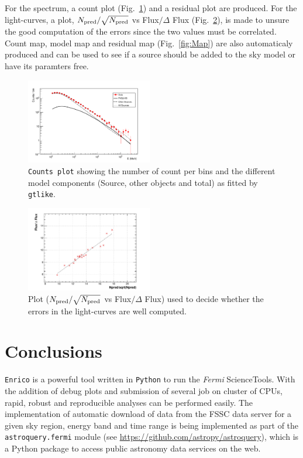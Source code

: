 \documentclass[a4paper]{article}
\newcommand{\Fermi}{\textit{Fermi} }
\begin{document}
For the spectrum, a count plot (Fig.~\ref{fig:control1}) and a residual plot are produced. For the light-curves, a plot, $N_{\rm pred}/\sqrt{N_{\rm pred}}$ vs Flux$/\Delta$ Flux (Fig.~\ref{fig:control2}), is made to unsure the good computation of the errors since the two values must be correlated. Count map, model map and residual map (Fig.~\ref{fig:Map}) are also automaticaly produced and can be used to see if a source should be added to the sky model or have its paramters free.


 \begin{figure}[t]
  \includegraphics[width=0.49\textwidth]{icrc2013_89_04}
  \caption{{\tt Counts plot} showing the number of count per bins and the different model components (Source, other objects and total) as fitted by {\tt gtlike}.}
\label{fig:control1}
 \end{figure}

 \begin{figure}[t]
  \includegraphics[width=0.49\textwidth]{icrc2013_89_05}
  \caption{Plot ($N_{\rm pred}/\sqrt{N_{\rm pred}}$ vs Flux$/\Delta$ Flux) used to decide whether the errors in the light-curves are well computed.}
\label{fig:control2}
 \end{figure}

\section{Conclusions}

{\tt Enrico} is a powerful tool written in {\tt Python} to run the \Fermi ScienceTools. With the addition of debug plots and submission of several job on cluster of CPUs, rapid, robust and reproducible analyses can be performed easily.
The implementation of automatic download of data from the FSSC data server for a given sky region, energy band and time range is being
implemented as part of the {\tt astroquery.fermi} module (see \url{https://github.com/astropy/astroquery}), which is a Python package
to access public astronomy data services on the web.
\end{document}

